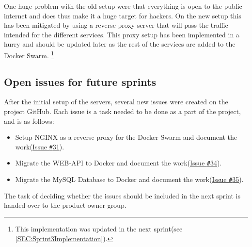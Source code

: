 One huge problem with the old setup were that everything is open to the public internet and does thus make it a huge target for hackers.
On the new setup this has been mitigated by using a reverse proxy server that will pass the traffic intended for the different services.
This proxy setup has been implemented in a hurry and should be updated later as the rest of the services are added to the Docker Swarm. \footnote{This implementation was updated in the next sprint(see \autoref{SEC:Sprint3Implementation}).}

\subsection{Open issues for future sprints}
After the initial setup of the servers, several new issues were created on the project GitHub.
Each issue is a task needed to be done as a part of the project, and is as follows:

\begin{itemize}
\item Setup NGINX as a reverse proxy for the Docker Swarm and document the work(\href{https://github.com/aau-giraf/wiki/issues/31}{Issue \texttt{\#}31}).
\item Migrate the WEB-API to Docker and document the work(\href{https://github.com/aau-giraf/wiki/issues/34}{Issue \texttt{\#}34}).
\item Migrate the MySQL Database to Docker and document the work(\href{https://github.com/aau-giraf/wiki/issues/35}{Issue \texttt{\#}35}).
\end{itemize}

The task of deciding whether the issues should be included in the next sprint is handed over to the product owner group.
